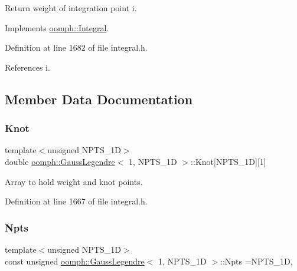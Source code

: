 Return weight of integration point i. 



Implements \hyperlink{classoomph_1_1Integral_ac65335e2aab120b285b3d6c294507b06}{oomph\+::\+Integral}.



Definition at line 1682 of file integral.\+h.



References i.



\subsection{Member Data Documentation}
\mbox{\label{classoomph_1_1GaussLegendre_3_011_00_01NPTS__1D_01_4_aa4ac5f2d0e456112d4d518400c89ea3a}} 
\subsubsection{\texorpdfstring{Knot}{Knot}}
{\footnotesize\ttfamily template$<$unsigned N\+P\+T\+S\+\_\+1D$>$ \\
double \hyperlink{classoomph_1_1GaussLegendre}{oomph\+::\+Gauss\+Legendre}$<$ 1, N\+P\+T\+S\+\_\+1D $>$\+::Knot\mbox{[}N\+P\+T\+S\+\_\+1D\mbox{]}\mbox{[}1\mbox{]}\hspace{0.3cm}{\ttfamily [private]}}



Array to hold weight and knot points. 



Definition at line 1667 of file integral.\+h.

\mbox{\label{classoomph_1_1GaussLegendre_3_011_00_01NPTS__1D_01_4_ac84ac1ef6d2afb4be37107c122bdf84a}} 
\subsubsection{\texorpdfstring{Npts}{Npts}}
{\footnotesize\ttfamily template$<$unsigned N\+P\+T\+S\+\_\+1D$>$ \\
const unsigned \hyperlink{classoomph_1_1GaussLegendre}{oomph\+::\+Gauss\+Legendre}$<$ 1, N\+P\+T\+S\+\_\+1D $>$\+::Npts =N\+P\+T\+S\+\_\+1D\hspace{0.3cm}{\ttfamily [static]}, {\ttfamily [private]}}



